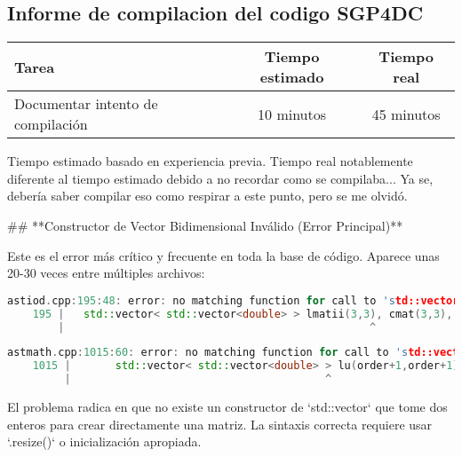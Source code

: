 \documentclass[12pt,a4paper]{article}
\begin{document}
\subsection{Informe de compilacion del codigo SGP4DC}
    \begin{center}
        \begin{tabular}{|l|c|c|}
            \hline
            \textbf{Tarea} & \textbf{Tiempo estimado} & \textbf{Tiempo real} \\
            \hline
            Documentar intento de compilación & 10 minutos & 45 minutos \\
            \hline
        \end{tabular}
    \end{center}
    \begin{center}
        Tiempo estimado basado en experiencia previa.
        \newline
        Tiempo real notablemente diferente al tiempo estimado debido a no recordar como se compilaba... Ya se, debería saber compilar eso como respirar a este punto, pero se me olvidó.
    \end{center}

\begin{markdown}

## **Constructor de Vector Bidimensional Inválido (Error Principal)**

Este es el error más crítico y frecuente en toda la base de código. Aparece unas 20-30 veces entre múltiples archivos:

\end{markdown}

\begin{lstlisting}[language=C++]
    astiod.cpp:195:48: error: no matching function for call to 'std::vector<std::vector<double> >::vector(int, int)'
    195 |   std::vector< std::vector<double> > lmatii(3,3), cmat(3,3), rhomat(3,3),
        |                                                ^
\end{lstlisting}
\begin{lstlisting}[language=C++]
    astmath.cpp:1015:60: error: no matching function for call to 'std::vector<std::vector<double> >::vector(int, int)'
    1015 |       std::vector< std::vector<double> > lu(order+1,order+1);
         |                                        ^
\end{lstlisting}

El problema radica en que no existe un constructor de `std::vector` que tome dos enteros para crear directamente una matriz. La sintaxis correcta requiere usar `.resize()` o inicialización apropiada.
\end{document}
